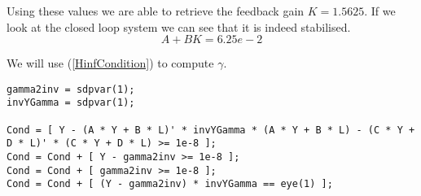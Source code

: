 Using these values we are able to retrieve the feedback gain $K = 1.5625$. If we look at the closed loop system we can see that it is indeed stabilised.
\begin{equation*}
	A + BK = 6.25e-2
\end{equation*}

We will use (\ref{HinfCondition}) to compute $\gamma$.


\begin{lstlisting}
gamma2inv = sdpvar(1);
invYGamma = sdpvar(1);

Cond = [ Y - (A * Y + B * L)' * invYGamma * (A * Y + B * L) - (C * Y + D * L)' * (C * Y + D * L) >= 1e-8 ];
Cond = Cond + [ Y - gamma2inv >= 1e-8 ];
Cond = Cond + [ gamma2inv >= 1e-8 ];
Cond = Cond + [ (Y - gamma2inv) * invYGamma == eye(1) ];
\end{lstlisting}


























